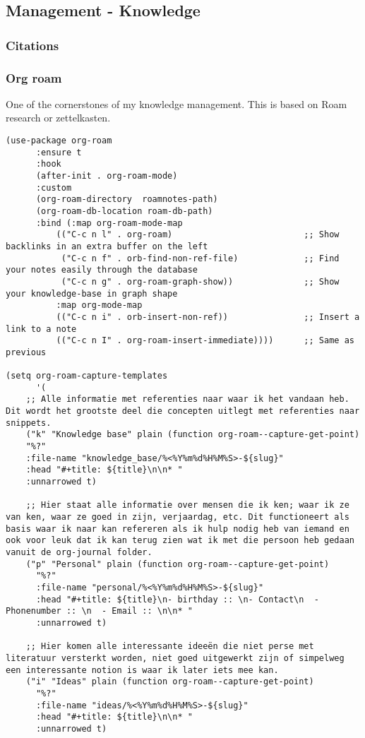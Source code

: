 \documentclass[11pt]{article}
\begin{document}
\subsection{Management - Knowledge}
\label{sec:orge9161b2}
\subsubsection{Citations}
\label{sec:org97ad08b}
\subsubsection{Org roam}
\label{sec:org34ead86}
One of the cornerstones of my knowledge management. This is based on Roam research or zettelkasten. 
\begin{verbatim}
(use-package org-roam
      :ensure t
      :hook
      (after-init . org-roam-mode)
      :custom
      (org-roam-directory  roamnotes-path)
      (org-roam-db-location roam-db-path)
      :bind (:map org-roam-mode-map
	      (("C-c n l" . org-roam)                          ;; Show backlinks in an extra buffer on the left
	       ("C-c n f" . orb-find-non-ref-file)             ;; Find your notes easily through the database
	       ("C-c n g" . org-roam-graph-show))              ;; Show your knowledge-base in graph shape
	      :map org-mode-map
	      (("C-c n i" . orb-insert-non-ref))               ;; Insert a link to a note
	      (("C-c n I" . org-roam-insert-immediate))))      ;; Same as previous

(setq org-roam-capture-templates
      '(
	;; Alle informatie met referenties naar waar ik het vandaan heb. Dit wordt het grootste deel die concepten uitlegt met referenties naar snippets.
	("k" "Knowledge base" plain (function org-roam--capture-get-point)
	"%?"
	:file-name "knowledge_base/%<%Y%m%d%H%M%S>-${slug}"
	:head "#+title: ${title}\n\n* "
	:unnarrowed t)

	;; Hier staat alle informatie over mensen die ik ken; waar ik ze van ken, waar ze goed in zijn, verjaardag, etc. Dit functioneert als basis waar ik naar kan refereren als ik hulp nodig heb van iemand en ook voor leuk dat ik kan terug zien wat ik met die persoon heb gedaan vanuit de org-journal folder.
	("p" "Personal" plain (function org-roam--capture-get-point)
	  "%?"
	  :file-name "personal/%<%Y%m%d%H%M%S>-${slug}"
	  :head "#+title: ${title}\n- birthday :: \n- Contact\n  - Phonenumber :: \n  - Email :: \n\n* "
	  :unnarrowed t)

	;; Hier komen alle interessante ideeën die niet perse met literatuur versterkt worden, niet goed uitgewerkt zijn of simpelweg een interessante notion is waar ik later iets mee kan.
	("i" "Ideas" plain (function org-roam--capture-get-point)
	  "%?"
	  :file-name "ideas/%<%Y%m%d%H%M%S>-${slug}"
	  :head "#+title: ${title}\n\n* "
	  :unnarrowed t)


\end{verbatim}
\end{document}
